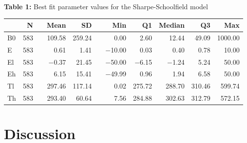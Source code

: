\documentclass[fontsize=11pt]{scrartcl}\usepackage[]{graphicx}\usepackage[]{color}
\begin{document}
  \begin{table}
    \begin{center}
    \textbf{Table 1:} Best fit parameter values for the Sharpe-Schoolfield model
    \end{center}
\begin{center}
\begin{longtable}{lrrrrrrrrrr}
  \toprule
   & N &   & Mean & SD &   & Min & Q1 & Median & Q3 & Max \\ 
    \cmidrule{2-2}  \cmidrule{4-5} \cmidrule{7-11}
 \endhead
B0 & 583 &  & 109.58 & 259.24 &  & 0.00 & 2.60 & 12.44 & 49.09 & 1000.00 \\ 
  E & 583 &  & 0.61 & 1.41 &  & $-$10.00 & 0.03 & 0.40 & 0.78 & 10.00 \\ 
  El & 583 &  & $-$0.37 & 21.45 &  & $-$50.00 & $-$6.15 & $-$1.24 & 5.24 & 50.00 \\ 
  Eh & 583 &  & 6.15 & 15.41 &  & $-$49.99 & 0.96 & 1.94 & 6.58 & 50.00 \\ 
  Tl & 583 &  & 297.46 & 117.14 &  & 0.02 & 275.72 & 288.70 & 310.46 & 599.74 \\ 
  Th & 583 &  & 293.40 & 60.64 &  & 7.56 & 284.88 & 302.63 & 312.79 & 572.15 \\ 
   \bottomrule
\end{longtable}
\end{center}

  \end{table}

  \section{Discussion}
\end{document}
